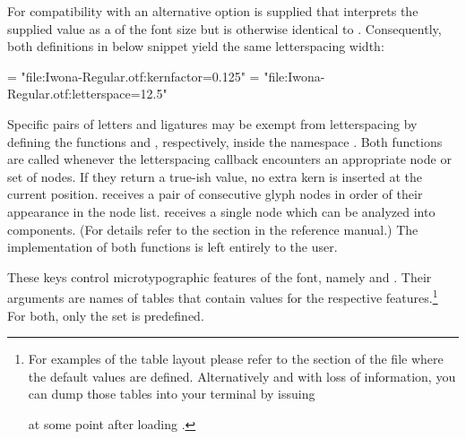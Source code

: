          For compatibility with \XETEX an alternative
          option is supplied that interprets the
         supplied value as a  of the font size but
         is otherwise identical to .
         Consequently, both definitions in below snippet yield the same
         letterspacing width:

         \beginlisting
    \font \iwonakernedA = "file:Iwona-Regular.otf:kernfactor=0.125"
    \font \iwonakernedB = "file:Iwona-Regular.otf:letterspace=12.5"
         \endlisting

         Specific pairs of letters and ligatures may be exempt from
         letterspacing by defining the \LUA functions
          and ,
         respectively, inside the namespace .
         Both functions are called whenever the letterspacing callback
         encounters an appropriate node or set of nodes.
         If they return a true-ish value, no extra kern is inserted at
         the current position.
          receives a pair of consecutive
         glyph nodes in order of their appearance in the node list.
          receives a single node which can be
         analyzed into components.
         (For details refer to the  section in the
         \LUATEX reference manual.)
         The implementation of both functions is left entirely to the
         user.
  \endaltitem

\iffalse
  \startbuffer [printvectors]
  \directlua{inspect(fonts.protrusions.setups.default)
             inspect(fonts.expansions.setups.default)}
  \stopbuffer
\fi

         These keys control microtypographic features of the font,
         namely  and .
         Their arguments are names of \LUA tables that contain
         values for the respective features.\footnote{%
            For examples of the table layout please refer to the
            section of the file  where the
            default values are defined.
            Alternatively and with loss of information, you can dump
            those tables into your terminal by issuing
            \unless \iffalse
              \beginlisting
 \directlua{inspect(fonts.protrusions.setups.default)
            inspect(fonts.expansions.setups.default)}
              \endlisting
            \else
              \typebuffer [printvectors]
            \fi
            at some point after loading .
         }
         For both, only the set  is predefined.

